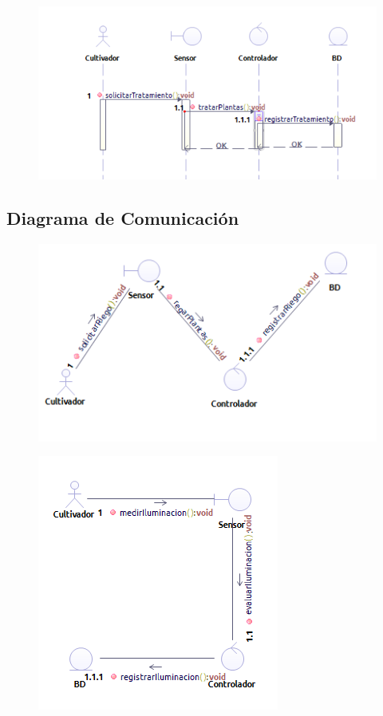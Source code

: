 \begin{figure}
	\centering
	\includegraphics[width=1\linewidth]{proyecto/imgs/SecuenciaTierra}
	\caption{}
	\label{fig:secuenciatierra}
\end{figure}


\subsection{Diagrama de Comunicación}

\begin{figure}
	\centering
	\includegraphics[width=0.8\linewidth]{proyecto/imgs/comunicacionRiego}
	\caption{}
	\label{fig:comunicacionriego}
\end{figure}


\begin{figure}
	\centering
	\includegraphics[width=0.6\linewidth]{proyecto/imgs/comunicacionIluminacion}
	\caption{}
	\label{fig:comunicacioniluminacion}
\end{figure}

